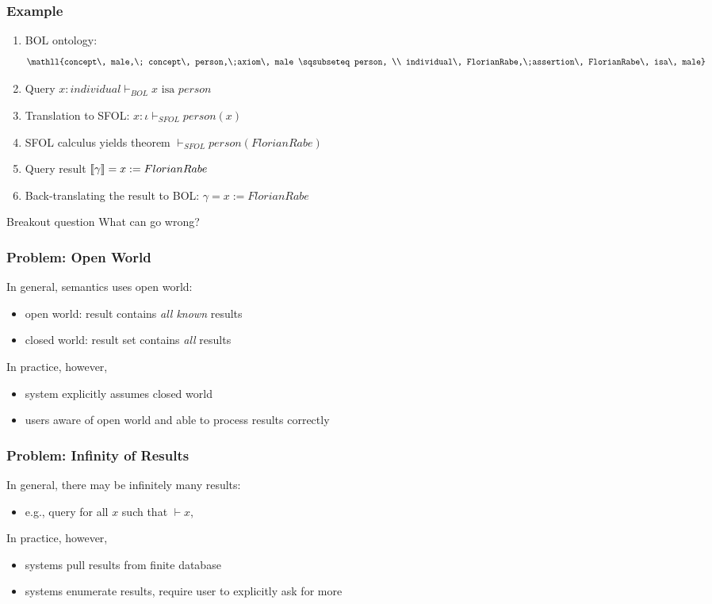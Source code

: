 \begin{frame}\frametitle{Example}
\begin{enumerate}
\item BOL ontology:
\[\mathll{concept\, male,\; concept\, person,\;axiom\, male \sqsubseteq person, \\
  individual\, FlorianRabe,\;assertion\, FlorianRabe\, isa\, male}\]
\item Query $x:individual\vdash_{BOL}x \text{ isa } person$
\item Translation to SFOL: $x:\iota\vdash_{SFOL} person(x)$
\item SFOL calculus yields theorem $\vdash_{SFOL}person(FlorianRabe)$
\item Query result $\llbracket \gamma\rrbracket= x:= FlorianRabe$
\item Back-translating the result to BOL: $\gamma= x:= FlorianRabe$
\end{enumerate}
\end{frame}

\begin{frame}{Breakout question}
What can go wrong?
\end{frame}

\begin{frame}\frametitle{Problem: Open World}
In general, semantics uses open world:
\begin{itemize}
\item open world: result contains \emph{all known} results
\item closed world: result set contains \emph{all} results
\end{itemize}

In practice, however,
\begin{itemize}
\item system explicitly assumes closed world
\item users aware of open world and able to process results correctly
\end{itemize}
\end{frame}

\begin{frame}\frametitle{Problem: Infinity of Results}
In general, there may be infinitely many results:
\begin{itemize}
\item e.g., query for all $x$ such that $\vdash x$,
\end{itemize}

In practice, however,
\begin{itemize}
\item systems pull results from finite database 
\item systems enumerate results, require user to explicitly ask for more 
\end{itemize}
\end{frame}

